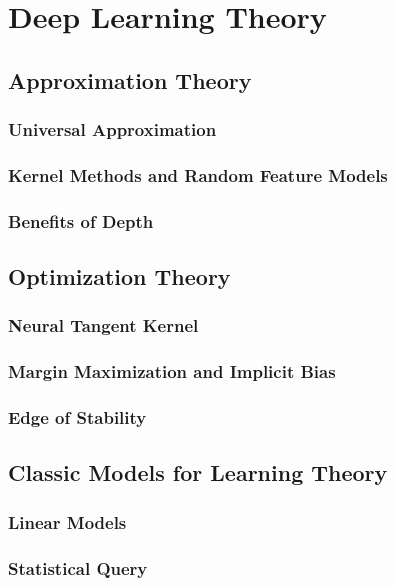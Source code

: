 \newpage
\section{Deep Learning Theory}

\subsection{Approximation Theory}

\subsubsection{Universal Approximation}

\subsubsection{Kernel Methods and Random Feature Models}

\subsubsection{Benefits of Depth}

\subsection{Optimization Theory}

\subsubsection{Neural Tangent Kernel}

\subsubsection{Margin Maximization and Implicit Bias}

\subsubsection{Edge of Stability}

\subsection{Classic Models for Learning Theory}

\subsubsection{Linear Models}

\subsubsection{Statistical Query}